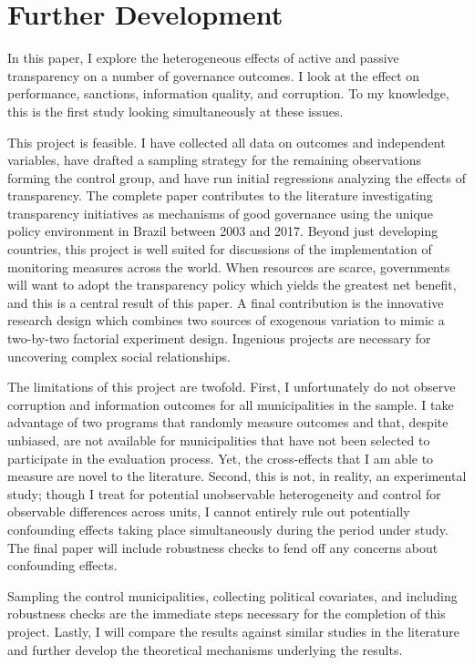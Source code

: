 \documentclass[11pt]{article}
\begin{document}
\section{Further Development} \label{sec:conclusion_paper3}

In this paper, I explore the heterogeneous effects of active and passive transparency on a number of governance outcomes. I look at the effect on performance, sanctions, information quality, and corruption. To my knowledge, this is the first study looking simultaneously at these issues.

This project is feasible. I have collected all data on outcomes and independent variables, have drafted a sampling strategy for the remaining observations forming the control group, and have run initial regressions analyzing the effects of transparency. The complete paper contributes to the literature investigating transparency initiatives as mechanisms of good governance using the unique policy environment in Brazil between 2003 and 2017. Beyond just developing countries, this project is well suited for discussions of the implementation of monitoring measures across the world. When resources are scarce, governments will want to adopt the transparency policy which yields the greatest net benefit, and this is a central result of this paper. A final contribution is the innovative research design which combines two sources of exogenous variation to mimic a two-by-two factorial experiment design. Ingenious projects are necessary for uncovering complex social relationships.

The limitations of this project are twofold. First, I unfortunately do not observe corruption and information outcomes for all municipalities in the sample. I take advantage of two programs that randomly measure outcomes and that, despite unbiased, are not available for municipalities that have not been selected to participate in the evaluation process. Yet, the cross-effects that I am able to measure are novel to the literature. Second, this is not, in reality, an experimental study; though I treat for potential unobservable heterogeneity and control for observable differences across units, I cannot entirely rule out potentially confounding effects taking place simultaneously during the period under study. The final paper will include robustness checks to fend off any concerns about confounding effects.

Sampling the control municipalities, collecting political covariates, and including robustness checks are the immediate steps necessary for the completion of this project. Lastly, I will compare the results against similar studies in the literature and further develop the theoretical mechanisms underlying the results.

\clearpage

\setlength\bibsep{0pt}


\end{document}

